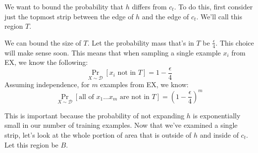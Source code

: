 \documentclass{article}
\begin{document}
\begin{center}
\end{center}

We want to bound the probability that $h$ differs from $c_t$. To do this, first consider just the topmost strip between the edge of $h$ and the edge of $c_t$. We'll call this region $T$.

\begin{center}
\end{center}

We can bound the size of $T$. Let the probability mass that's in $T$ be $\frac{\epsilon}{4}$. This choice will make sense soon. This means that when sampling a single example $x_i$ from EX, we know the following:
\[\Pr_{X \sim \mathcal{D}}[x_i \text{ not in } T] = 1 - \frac{\epsilon}{4}\]
Assuming independence, for $m$ examples from EX, we know:
\[\Pr_{X \sim \mathcal{D}}[\text{all of } x_1 \dots x_m \text{ are not in } T] = \left(1 - \frac{\epsilon}{4}\right)^m\]

This is important because the probability of not expanding $h$ is exponentially small in our number of training examples. Now that we've examined a single strip, let's look at the whole portion of area that is outside of $h$ and inside of $c_t$. Let this region be $B$.

\begin{center}
\end{center}
\end{document}

